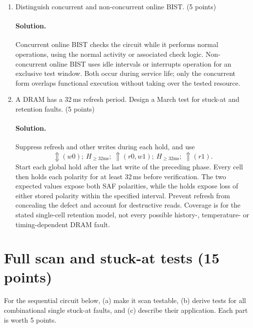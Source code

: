 \documentclass[11pt,a4paper]{article}
\newcommand{\sol}{\paragraph{Solution.}}
\newcommand{\up}{\Uparrow}\newcommand{\dn}{\Downarrow}\newcommand{\any}{\Updownarrow}
\begin{document}
\begin{enumerate}[label=(\alph*)]
\item Distinguish concurrent and non-concurrent online BIST. (5 points)
\sol Concurrent online BIST checks the circuit while it performs normal operations, using the normal activity or associated check logic. Non-concurrent online BIST uses idle intervals or interrupts operation for an exclusive test window. Both occur during service life; only the concurrent form overlaps functional execution without taking over the tested resource.

\item A DRAM has a 32\,ms refresh period. Design a March test for stuck-at and retention faults. (5 points)
\sol Suppress refresh and other writes during each hold, and use
\[
 \any(w0);\ H_{\ge32\mathrm{ms}};\ \up(r0,w1);\
 H_{\ge32\mathrm{ms}};\ \up(r1).
\]
Start each global hold after the last write of the preceding phase. Every cell then holds each polarity for at least 32\,ms before verification. The two expected values expose both SAF polarities, while the holds expose loss of either stored polarity within the specified interval. Prevent refresh from concealing the defect and account for destructive reads. Coverage is for the stated single-cell retention model, not every possible history-, temperature- or timing-dependent DRAM fault.
\end{enumerate}

\section{Full scan and stuck-at tests (15 points)}
For the sequential circuit below, (a) make it scan testable, (b) derive tests for all combinational single stuck-at faults, and (c) describe their application. Each part is worth 5 points.
\end{document}
